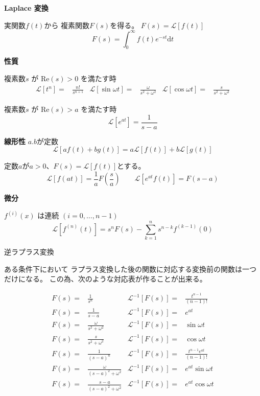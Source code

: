 \documentclass[12pt,b5paper]{ltjsarticle}
\begin{document}
\hrulefill
\textbf{Laplace 変換}
\hrulefill

実関数$f(t)$から
複素関数$F(s)$を得る。
$F(s)=\mathcal{L}[f(t)]$
\begin{equation}
 F(s) = \int_{0}^{\infty} f(t)e^{-st} \mathrm{d}t
\end{equation}


\dotfill
\textbf{性質}
\dotfill


複素数$s$ が $\mathrm{Re}(s)>0$ を満たす時
\begin{align}
 \mathcal{L}[t^n] =& \frac{n!}{s^{n+1}} &
 \mathcal{L}[\sin \omega t] =& \frac{\omega}{s^{2}+\omega^2} &
 \mathcal{L}[\cos \omega t] =& \frac{s}{s^{2}+\omega^2}
\end{align}

複素数$s$ が $\mathrm{Re}(s)>a$ を満たす時
\begin{equation}
 \mathcal{L}[e^{at}] = \frac{1}{s-a}
\end{equation}

\textbf{線形性}
$a.b$が定数
\begin{equation}
 \mathcal{L}[af(t)+bg(t)] = a\mathcal{L}[f(t)] + b\mathcal{L}[g(t)]
\end{equation}


定数$a$が$a>0$、$F(s)=\mathcal{L}[f(t)]$とする。
\begin{equation}
 \mathcal{L}[f(at)] = \frac{1}{a}F\left(\frac{s}{a}\right)
  \qquad
 \mathcal{L}[e^{at}f(t)] = F(s-a)
\end{equation}


\dotfill

\textbf{微分}

$f^{(i)}(x)$ は連続 $(i=0,\dots, n-1)$
\begin{equation}
 \mathcal{L}[ f^{(n)}(t) ]
  = s^n F(s) - \sum_{k=1}^{n} s^{n-k}f^{(k-1)}(0)
\end{equation}


\hrulefill
逆ラプラス変換
\hrulefill

ある条件下において
ラプラス変換した後の関数に対応する変換前の関数は一つだけになる。
この為、次のような対応表が作ることが出来る。

\begin{align}
%
 F(s) =& \frac{1}{s^{n}}  & \mathcal{L}^{-1}[F(s)] = & \frac{t^{n-1}}{(n-1)!} \label{base_01}\\
 F(s) =& \frac{1}{s-a} & \mathcal{L}^{-1}[F(s)] = & e^{at} \label{base_02}\\
 F(s) =& \frac{\omega}{s^2+\omega^2} & \mathcal{L}^{-1}[F(s)] = & \sin\omega t \\
 F(s) =& \frac{s}{s^2+\omega^2} & \mathcal{L}^{-1}[F(s)] = & \cos\omega t \\
 F(s) =& \frac{1}{(s-a)^{n}}  & \mathcal{L}^{-1}[F(s)] = & \frac{t^{n-1}e^{at}}{(n-1)!} \\
 F(s) =& \frac{\omega}{(s-a)^2+\omega^2} & \mathcal{L}^{-1}[F(s)] = & e^{at}\sin\omega t \\
 F(s) =& \frac{s-a}{(s-a)^2+\omega^2} & \mathcal{L}^{-1}[F(s)] = & e^{at}\cos\omega t \label{base_07}
\end{align}
\end{document}
